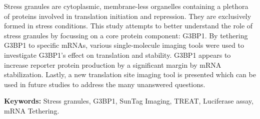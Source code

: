 Stress granules are cytoplasmic, membrane-less organelles containing a plethora of proteins involved in translation initiation and repression.
They are exclusively formed in stress conditions.
This study attempts to better understand the role of stress granules by focussing on a core protein component: G3BP1.
By tethering G3BP1 to specific mRNAs, various single-molecule imaging tools were used to investigate G3BP1's effect on translation and stability.
G3BP1 appears to increase reporter protein production by a significant margin by mRNA stabilization.
Lastly, a new translation site imaging tool is presented which can be used in future studies to address the many unanswered questions.

\noindent
\textbf{Keywords:}
Stress granules, G3BP1, SunTag Imaging, TREAT, Luciferase assay, mRNA Tethering.